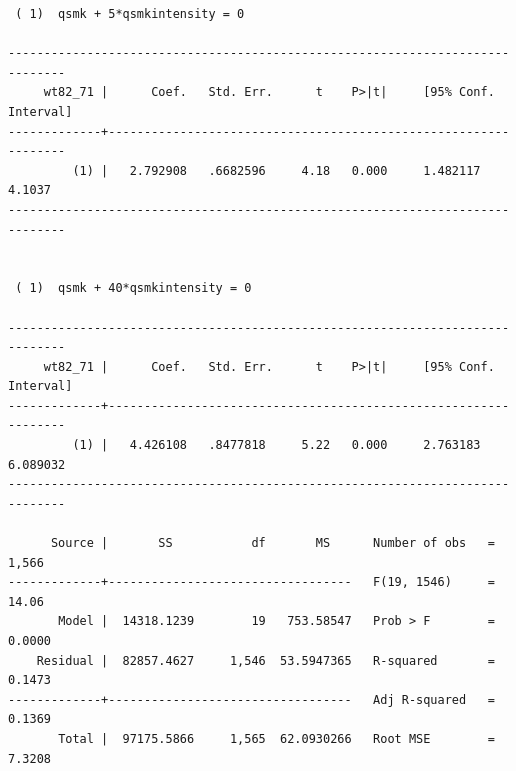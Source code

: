 \documentclass[
  10pt,
]{book}
\begin{document}
\begin{verbatim}
 ( 1)  qsmk + 5*qsmkintensity = 0

------------------------------------------------------------------------------
     wt82_71 |      Coef.   Std. Err.      t    P>|t|     [95% Conf. Interval]
-------------+----------------------------------------------------------------
         (1) |   2.792908   .6682596     4.18   0.000     1.482117      4.1037
------------------------------------------------------------------------------


 ( 1)  qsmk + 40*qsmkintensity = 0

------------------------------------------------------------------------------
     wt82_71 |      Coef.   Std. Err.      t    P>|t|     [95% Conf. Interval]
-------------+----------------------------------------------------------------
         (1) |   4.426108   .8477818     5.22   0.000     2.763183    6.089032
------------------------------------------------------------------------------

      Source |       SS           df       MS      Number of obs   =     1,566
-------------+----------------------------------   F(19, 1546)     =     14.06
       Model |  14318.1239        19   753.58547   Prob > F        =    0.0000
    Residual |  82857.4627     1,546  53.5947365   R-squared       =    0.1473
-------------+----------------------------------   Adj R-squared   =    0.1369
       Total |  97175.5866     1,565  62.0930266   Root MSE        =    7.3208


\end{verbatim}
\end{document}
